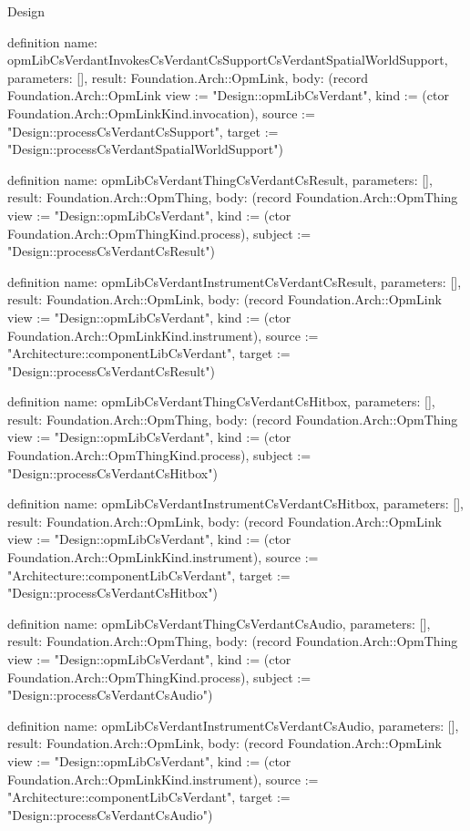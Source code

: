 \begin{lexlean}{Design}
\begin{semanticmodule}
definition{
  name: opmLibCsVerdantInvokesCsVerdantCsSupportCsVerdantSpatialWorldSupport,
  parameters: [],
  result: Foundation.Arch::OpmLink,
  body: (record Foundation.Arch::OpmLink {view := "Design::opmLibCsVerdant", kind := (ctor Foundation.Arch::OpmLinkKind.invocation), source := "Design::processCsVerdantCsSupport", target := "Design::processCsVerdantSpatialWorldSupport"})
}

definition{
  name: opmLibCsVerdantThingCsVerdantCsResult,
  parameters: [],
  result: Foundation.Arch::OpmThing,
  body: (record Foundation.Arch::OpmThing {view := "Design::opmLibCsVerdant", kind := (ctor Foundation.Arch::OpmThingKind.process), subject := "Design::processCsVerdantCsResult"})
}

definition{
  name: opmLibCsVerdantInstrumentCsVerdantCsResult,
  parameters: [],
  result: Foundation.Arch::OpmLink,
  body: (record Foundation.Arch::OpmLink {view := "Design::opmLibCsVerdant", kind := (ctor Foundation.Arch::OpmLinkKind.instrument), source := "Architecture::componentLibCsVerdant", target := "Design::processCsVerdantCsResult"})
}

definition{
  name: opmLibCsVerdantThingCsVerdantCsHitbox,
  parameters: [],
  result: Foundation.Arch::OpmThing,
  body: (record Foundation.Arch::OpmThing {view := "Design::opmLibCsVerdant", kind := (ctor Foundation.Arch::OpmThingKind.process), subject := "Design::processCsVerdantCsHitbox"})
}

definition{
  name: opmLibCsVerdantInstrumentCsVerdantCsHitbox,
  parameters: [],
  result: Foundation.Arch::OpmLink,
  body: (record Foundation.Arch::OpmLink {view := "Design::opmLibCsVerdant", kind := (ctor Foundation.Arch::OpmLinkKind.instrument), source := "Architecture::componentLibCsVerdant", target := "Design::processCsVerdantCsHitbox"})
}

definition{
  name: opmLibCsVerdantThingCsVerdantCsAudio,
  parameters: [],
  result: Foundation.Arch::OpmThing,
  body: (record Foundation.Arch::OpmThing {view := "Design::opmLibCsVerdant", kind := (ctor Foundation.Arch::OpmThingKind.process), subject := "Design::processCsVerdantCsAudio"})
}

definition{
  name: opmLibCsVerdantInstrumentCsVerdantCsAudio,
  parameters: [],
  result: Foundation.Arch::OpmLink,
  body: (record Foundation.Arch::OpmLink {view := "Design::opmLibCsVerdant", kind := (ctor Foundation.Arch::OpmLinkKind.instrument), source := "Architecture::componentLibCsVerdant", target := "Design::processCsVerdantCsAudio"})
}


\end{semanticmodule}
\end{lexlean}
